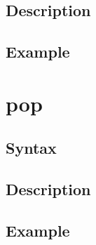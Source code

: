 \documentclass[11pt]{scrartcl}
\begin{document}
\subsection{Description}
\subsection{Example}

\section{pop}
\subsection{Syntax}
\subsection{Description}
\subsection{Example}
\end{document}
